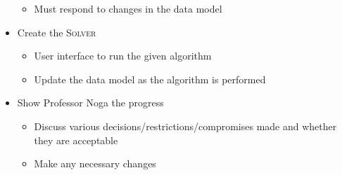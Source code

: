 \begin{itemize}
\begin{itemize}
		\item Must respond to changes in the data model
	\end{itemize}
	\item Create the \textsc{Solver}
	\begin{itemize}
		\item User interface to run the given algorithm
		\item Update the data model as the algorithm is performed
	\end{itemize}
	\item Show Professor Noga the progress
	\begin{itemize}
		\item Discuss various decisions/restrictions/compromises made
			and whether they are acceptable
		\item Make any necessary changes
	\end{itemize}
\end{itemize}